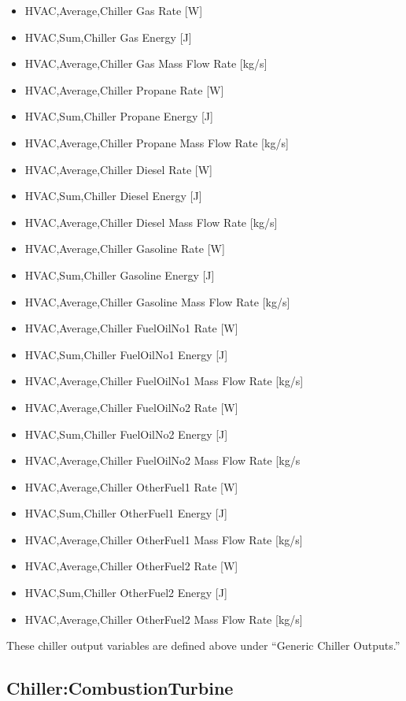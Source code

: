 \begin{itemize}
\item
  HVAC,Average,Chiller Gas Rate {[}W{]}
\item
  HVAC,Sum,Chiller Gas Energy {[}J{]}
\item
  HVAC,Average,Chiller Gas Mass Flow Rate {[}kg/s{]}
\item
  HVAC,Average,Chiller Propane Rate {[}W{]}
\item
  HVAC,Sum,Chiller Propane Energy {[}J{]}
\item
  HVAC,Average,Chiller Propane Mass Flow Rate {[}kg/s{]}
\item
  HVAC,Average,Chiller Diesel Rate {[}W{]}
\item
  HVAC,Sum,Chiller Diesel Energy {[}J{]}
\item
  HVAC,Average,Chiller Diesel Mass Flow Rate {[}kg/s{]}
\item
  HVAC,Average,Chiller Gasoline Rate {[}W{]}
\item
  HVAC,Sum,Chiller Gasoline Energy {[}J{]}
\item
  HVAC,Average,Chiller Gasoline Mass Flow Rate {[}kg/s{]}
\item
  HVAC,Average,Chiller FuelOilNo1 Rate {[}W{]}
\item
  HVAC,Sum,Chiller FuelOilNo1 Energy {[}J{]}
\item
  HVAC,Average,Chiller FuelOilNo1 Mass Flow Rate {[}kg/s{]}
\item
  HVAC,Average,Chiller FuelOilNo2 Rate {[}W{]}
\item
  HVAC,Sum,Chiller FuelOilNo2 Energy {[}J{]}
\item
  HVAC,Average,Chiller FuelOilNo2 Mass Flow Rate {[}kg/s
\item
  HVAC,Average,Chiller OtherFuel1 Rate {[}W{]}
\item
  HVAC,Sum,Chiller OtherFuel1 Energy {[}J{]}
\item
  HVAC,Average,Chiller OtherFuel1 Mass Flow Rate {[}kg/s{]}
\item
  HVAC,Average,Chiller OtherFuel2 Rate {[}W{]}
\item
  HVAC,Sum,Chiller OtherFuel2 Energy {[}J{]}
\item
  HVAC,Average,Chiller OtherFuel2 Mass Flow Rate {[}kg/s{]}
\end{itemize}

These chiller output variables are defined above under ``Generic Chiller Outputs.''

\subsection{Chiller:CombustionTurbine}\label{chillercombustionturbine}


